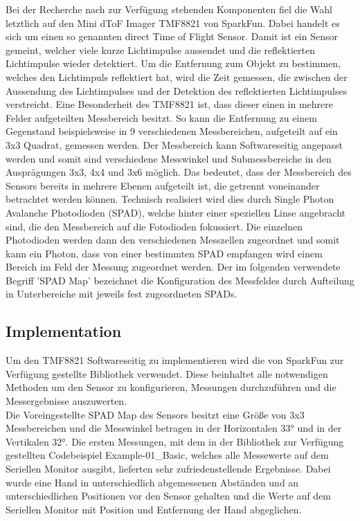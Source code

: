         Bei der Recherche nach zur Verfügung stehenden Komponenten fiel die Wahl letztlich auf den Mini dToF Imager TMF8821 von SparkFun. Dabei handelt es sich um einen so genannten direct Time of Flight Sensor. Damit ist ein Sensor gemeint, welcher viele kurze Lichtimpulse aussendet und die reflektierten Lichtimpulse wieder detektiert. Um die Entfernung zum Objekt zu bestimmen, welches den Lichtimpuls reflektiert hat, wird die Zeit gemessen, die zwischen der Aussendung des Lichtimpulses und der Detektion des reflektierten Lichtimpulses verstreicht. Eine Besonderheit des TMF8821 ist, dass dieser einen in mehrere Felder aufgeteilten Messbereich besitzt. So kann die Entfernung zu einem Gegenstand beispielsweise in 9 verschiedenen Messbereichen, aufgeteilt auf ein 3x3 Quadrat, gemessen werden. Der Messbereich kann Softwareseitig angepasst werden und somit sind verschiedene Messwinkel und Submessbereiche in den Ausprägungen 3x3, 4x4 und 3x6 möglich. Das bedeutet, dass der Messbereich des Sensors bereits in mehrere Ebenen aufgeteilt ist, die getrennt voneinander betrachtet werden können. Technisch realisiert wird dies durch Single Photon Avalanche Photodioden (SPAD), welche hinter einer speziellen Linse angebracht sind, die den Messbereich auf die Fotodioden fokussiert. Die einzelnen Photodioden werden dann den verschiedenen Messzellen zugeordnet und somit kann ein Photon, dass von einer bestimmten SPAD empfangen wird einem Bereich im Feld der Messung zugeordnet werden. Der im folgenden verwendete Begriff 'SPAD Map' bezeichnet die Konfiguration des Messfeldes durch Aufteilung in Unterbereiche mit jeweils fest zugeordneten SPADs.\\

    \subsection{Implementation}
        Um den TMF8821 Softwareseitig zu implementieren wird die von SparkFun zur Verfügung gestellte Bibliothek verwendet. Diese beinhaltet alle notwendigen Methoden um den Sensor zu konfigurieren, Messungen durchzuführen und die Messergebnisse auszuwerten.\\

        Die Voreingestellte SPAD Map des Sensors besitzt eine Größe von 3x3 Messbereichen und die Messwinkel betragen in der Horizontalen 33° und in der Vertikalen 32°. Die ersten Messungen, mit dem in der Bibliothek zur Verfügung gestellten Codebeispiel Example-01\_Basic, welches alle Messewerte auf dem Seriellen Monitor ausgibt, lieferten sehr zufriedenstellende Ergebnisse. Dabei wurde eine Hand in unterschiedlich abgemessenen Abständen und an unterschiedlichen Positionen vor den Sensor gehalten und die Werte auf dem Seriellen Monitor mit Position und Entfernung der Hand abgeglichen.\\

